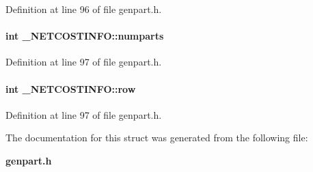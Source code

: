 Definition at line 96 of file genpart.h.\label{_NETCOSTINFO_m1}
\paragraph{\setlength{\rightskip}{0pt plus 5cm}int \_\-NETCOSTINFO::numparts}\hfill



Definition at line 97 of file genpart.h.\label{_NETCOSTINFO_m2}
\paragraph{\setlength{\rightskip}{0pt plus 5cm}int \_\-NETCOSTINFO::row}\hfill



Definition at line 97 of file genpart.h.

The documentation for this struct was generated from the following file:\begin{CompactItemize}
\item 
{\bf genpart.h}\end{CompactItemize}
